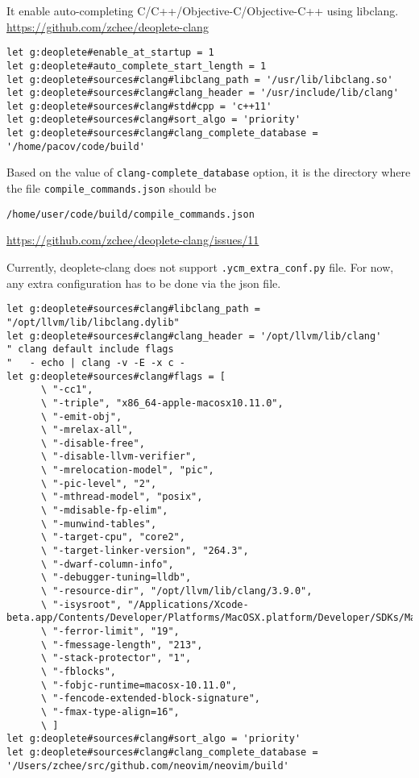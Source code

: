 It enable auto-completing C/C++/Objective-C/Objective-C++
using libclang.  \url{https://github.com/zchee/deoplete-clang}


\begin{verbatim}
let g:deoplete#enable_at_startup = 1
let g:deoplete#auto_complete_start_length = 1
let g:deoplete#sources#clang#libclang_path = '/usr/lib/libclang.so'
let g:deoplete#sources#clang#clang_header = '/usr/include/lib/clang'
let g:deoplete#sources#clang#std#cpp = 'c++11'
let g:deoplete#sources#clang#sort_algo = 'priority'
let g:deoplete#sources#clang#clang_complete_database = '/home/pacov/code/build'
\end{verbatim}
Based on the value of \verb!clang-complete_database! option, it is the
directory where the file \verb!compile_commands.json! should
be
\begin{verbatim}
/home/user/code/build/compile_commands.json
\end{verbatim}
\url{https://github.com/zchee/deoplete-clang/issues/11}

Currently, deoplete-clang does not support \verb!.ycm_extra_conf.py! file. For
now, any extra configuration has to be done via the json file.
\begin{verbatim}
let g:deoplete#sources#clang#libclang_path = "/opt/llvm/lib/libclang.dylib"
let g:deoplete#sources#clang#clang_header = '/opt/llvm/lib/clang'
" clang default include flags
"   - echo | clang -v -E -x c -
let g:deoplete#sources#clang#flags = [
      \ "-cc1",
      \ "-triple", "x86_64-apple-macosx10.11.0",
      \ "-emit-obj",
      \ "-mrelax-all",
      \ "-disable-free",
      \ "-disable-llvm-verifier",
      \ "-mrelocation-model", "pic",
      \ "-pic-level", "2",
      \ "-mthread-model", "posix",
      \ "-mdisable-fp-elim",
      \ "-munwind-tables",
      \ "-target-cpu", "core2",
      \ "-target-linker-version", "264.3",
      \ "-dwarf-column-info",
      \ "-debugger-tuning=lldb",
      \ "-resource-dir", "/opt/llvm/lib/clang/3.9.0",
      \ "-isysroot", "/Applications/Xcode-beta.app/Contents/Developer/Platforms/MacOSX.platform/Developer/SDKs/MacOSX10.11.sdk",
      \ "-ferror-limit", "19",
      \ "-fmessage-length", "213",
      \ "-stack-protector", "1",
      \ "-fblocks",
      \ "-fobjc-runtime=macosx-10.11.0",
      \ "-fencode-extended-block-signature",
      \ "-fmax-type-align=16",
      \ ]
let g:deoplete#sources#clang#sort_algo = 'priority'
let g:deoplete#sources#clang#clang_complete_database = '/Users/zchee/src/github.com/neovim/neovim/build'
\end{verbatim}


